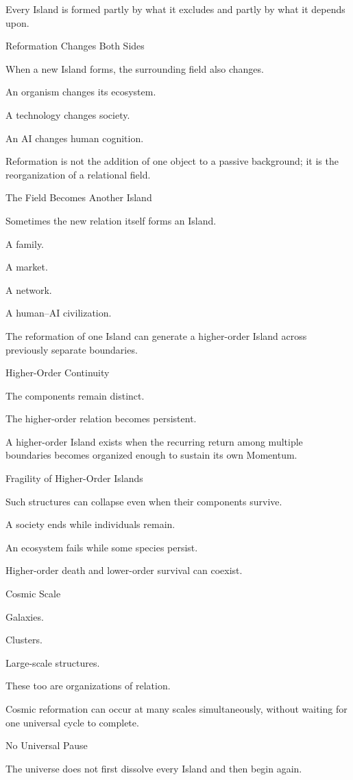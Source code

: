 Every Island is formed partly by what it excludes and partly by what it depends upon.

Reformation Changes Both Sides

When a new Island forms, the surrounding field also changes.

An organism changes its ecosystem.

A technology changes society.

An AI changes human cognition.

Reformation is not the addition of one object to a passive background; it is the reorganization of a relational field.

The Field Becomes Another Island

Sometimes the new relation itself forms an Island.

A family.

A market.

A network.

A human–AI civilization.

The reformation of one Island can generate a higher-order Island across previously separate boundaries.

Higher-Order Continuity

The components remain distinct.

The higher-order relation becomes persistent.

A higher-order Island exists when the recurring return among multiple boundaries becomes organized enough to sustain its own Momentum.

Fragility of Higher-Order Islands

Such structures can collapse even when their components survive.

A society ends while individuals remain.

An ecosystem fails while some species persist.

Higher-order death and lower-order survival can coexist.

Cosmic Scale

Galaxies.

Clusters.

Large-scale structures.

These too are organizations of relation.

Cosmic reformation can occur at many scales simultaneously, without waiting for one universal cycle to complete.

No Universal Pause

The universe does not first dissolve every Island and then begin again.

